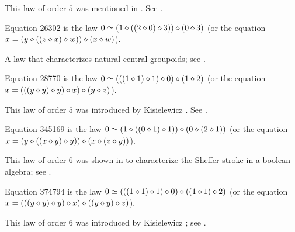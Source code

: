 This law of order $5$ was mentioned in \cite{Kisielewicz2}.  See .

\begin{definition}[Equation 26302]
  \label{eq26302}
  Equation 26302 is the law $0  \simeq (1 \diamond ((2 \diamond 0) \diamond 3)) \diamond (0 \diamond 3)$ (or the equation $x = (y \diamond ((z \diamond x) \diamond w)) \diamond (x \diamond w)$).
\end{definition}

A law that characterizes natural central groupoids; see .

\begin{definition}[Equation 28770]
  \label{eq28770}\leanok
  Equation 28770 is the law $0  \simeq  (((1 \diamond 1) \diamond 1) \diamond 0) \diamond (1 \diamond 2)$ (or the equation $x = (((y \diamond y) \diamond y) \diamond x) \diamond (y \diamond z)$).
\end{definition}

This law of order $5$ was introduced by Kisielewicz \cite{Kisielewicz}. See .

\begin{definition}[Equation 345169]
  \label{eq345169}
  Equation 345169 is the law $0  \simeq  (1 \diamond ((0 \diamond 1) \diamond 1)) \diamond (0 \diamond (2 \diamond 1))$ (or the equation $x = (y \diamond ((x \diamond y) \diamond y)) \diamond (x \diamond (z \diamond y))$).
\end{definition}

This law of order $6$ was shown in \cite{mccune_et_al} to characterize the Sheffer stroke in a boolean algebra; see .

\begin{definition}[Equation 374794]
  \leanok
  \label{eq374794}
  Equation 374794 is the law $0  \simeq  (((1 \diamond 1) \diamond 1) \diamond 0) \diamond ((1 \diamond 1) \diamond 2)$ (or the equation $x = (((y \diamond y) \diamond y) \diamond x) \diamond ((y \diamond y) \diamond z)$).
\end{definition}

This law of order $6$ was introduced by Kisielewicz \cite{Kisielewicz}; see .
